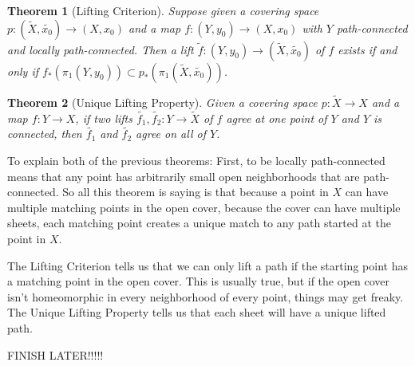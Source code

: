 \documentclass[12pt]{article}
\newtheorem{theorem}{Theorem}
\begin{document}
\begin{theorem}[Lifting Criterion]
  Suppose given a covering space $p: (\tilde{X}, \tilde{x_0}) \to (X,x_0)$ and a map $f:(Y,y_0) \to (X,x_0)$ with $Y$ path-connected and locally path-connected. Then a lift
  $\tilde{f}:(Y,y_0) \to (\tilde{X}, \tilde{x_0})$ of $f$ exists if and only if $f_*(\pi_1(Y,y_0)) \subset p_*(\pi_1(\tilde{X}, \tilde{x_0}))$.
\end{theorem}

\begin{theorem}[Unique Lifting Property]
  Given a covering space $p: \tilde{X} \to X$ and a map $f: Y \to X$, if two lifts $\tilde{f_1}, \tilde{f_2}: Y \to \tilde{X}$ 
  of $f$ agree at one point of $Y$ and $Y$ is connected, then $\tilde{f_1}$ and $\tilde{f_2}$ agree on all of $Y$. 
\end{theorem}

To explain both of the previous theorems: First, to be locally path-connected means that any point has arbitrarily small open neighborhoods that are 
path-connected. So all this theorem is saying is that because a point in $X$ can have multiple matching points 
in the open cover, because the cover can have multiple sheets, each matching point creates a unique match to
any path started at the point in $X$. 
\par The Lifting Criterion tells us that we can only lift a path if the starting point has a matching point in the open cover. 
This is usually true, but if the open cover isn't homeomorphic in every neighborhood of every point, things may get freaky. 
The Unique Lifting Property tells us that each sheet will have a unique lifted path. 

FINISH LATER!!!!!
\end{document}
